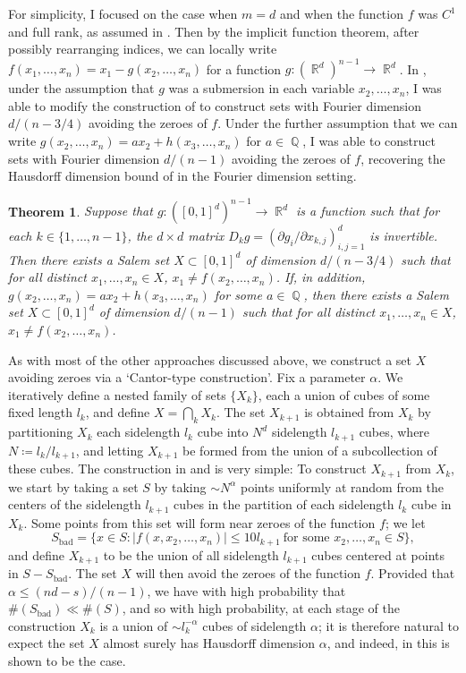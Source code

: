 \documentclass[11pt]{article}
\newtheorem*{theorem}{Theorem}
\DeclareMathOperator{\QQ}{\mathbb{Q}}
\DeclareMathOperator{\RR}{\mathbb{R}}
\begin{document}
For simplicity, I focused on the case when $m = d$ and when the function $f$ was $C^1$ and full rank, as assumed in \cite{FraserPramanik}. Then by the implicit function theorem, after possibly rearranging indices, we can locally write $f(x_1,\dots,x_n) = x_1 - g(x_2,\dots,x_n)$ for a function $g: (\RR^d)^{n-1} \to \RR^d$. In \cite{DensonFourier}, under the assumption that $g$ was a submersion in each variable $x_2,\dots,x_n$, I was able to modify the construction of \cite{FraserPramanik} to construct sets with Fourier dimension $d/(n-3/4)$ avoiding the zeroes of $f$. Under the further assumption that we can write $g(x_2,\dots,x_n) = ax_2 + h(x_3,\dots,x_n)$ for $a \in \QQ$, I was able to construct sets with Fourier dimension $d/(n-1)$ avoiding the zeroes of $f$, recovering the Hausdorff dimension bound of \cite{FraserPramanik} in the Fourier dimension setting.

\begin{theorem}
	Suppose that $g: ([0,1]^d)^{n-1} \to \RR^d$ is a function such that for each $k \in \{ 1, \dots, n-1 \}$, the $d \times d$ matrix $D_k g = ( \partial g_i / \partial x_{k,j} )_{i,j = 1}^d$ is invertible. Then there exists a Salem set $X \subset [0,1]^d$ of dimension $d/(n-3/4)$ such that for all distinct $x_1,\dots,x_n \in X$, $x_1 \neq f(x_2,\dots,x_n)$. If, in addition, $g(x_2,\dots,x_n) = ax_2 + h(x_3,\dots,x_n)$ for some $a \in \QQ$, then there exists a Salem set $X \subset [0,1]^d$ of dimension $d/(n-1)$ such that for all distinct $x_1,\dots,x_n \in X$, $x_1 \neq f(x_2,\dots,x_n)$.
\end{theorem}

As with most of the other approaches discussed above, we construct a set $X$ avoiding zeroes via a `Cantor-type construction'. Fix a parameter $\alpha$. We iteratively define a nested family of sets $\{ X_k \}$, each a union of cubes of some fixed length $l_k$, and define $X = \bigcap_k X_k$. The set $X_{k+1}$ is obtained from $X_k$ by partitioning $X_k$ each sidelength $l_k$ cube into $N^d$ sidelength $l_{k+1}$ cubes, where $N \coloneqq l_k / l_{k+1}$, and letting $X_{k+1}$ be formed from the union of a subcollection of these cubes. The construction in \cite{DensonPramanikZahl} and \cite{DensonFourier} is very simple: To construct $X_{k+1}$ from $X_k$, we start by taking a set $S$ by taking $\sim N^\alpha$ points uniformly at random from the centers of the sidelength $l_{k+1}$ cubes in the partition of each sidelength $l_k$ cube in $X_k$. Some points from this set will form near zeroes of the function $f$; we let
%
\[ S_{\text{bad}} = \{ x \in S : |f(x,x_2,\dots,x_n)| \leq 10 l_{k+1}\ \text{for some $x_2,\dots,x_n \in S$} \}, \]
%
and define $X_{k+1}$ to be the union of all sidelength $l_{k+1}$ cubes centered at points in $S - S_{\text{bad}}$. The set $X$ will then avoid the zeroes of the function $f$. Provided that $\alpha \leq (nd - s)/(n-1)$, we have with high probability that $\#(S_{\text{bad}}) \ll \#(S)$, and so with high probability, at each stage of the construction $X_k$ is a union of $\sim l_k^{-\alpha}$ cubes of sidelength $\alpha$; it is therefore natural to expect the set $X$ almost surely has Hausdorff dimension $\alpha$, and indeed, in \cite{DensonPramanikZahl} this is shown to be the case.
\end{document}
